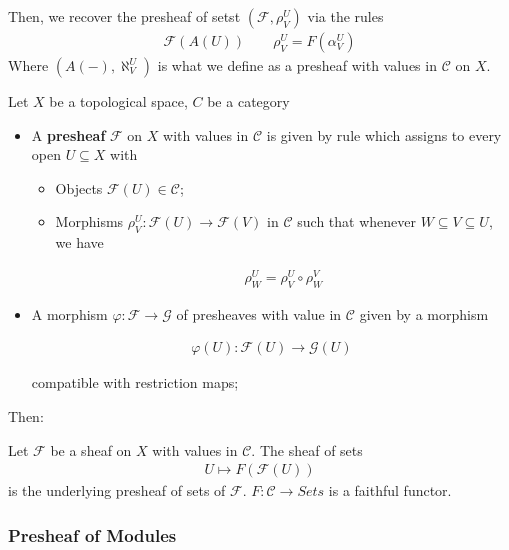 \documentclass[Total.tex]{subfiles}
\begin{document}
				Then, we recover the presheaf of setst $(\mathcal{F},\rho^U_V)$ via the rules
				\begin{gather*}
					\mathcal{F}(A(U))\qquad \rho^U_V=F(\alpha^U_V)
				\end{gather*}
				Where $(A(-),\aleph^U_V)$ is what we define as a presheaf with values in $\mathcal{C}$ on $X$.
				\begin{Def}
					Let $X$ be a topological space, $C$ be a category
					
					\begin{itemize}
						\item A \textbf{presheaf} $\mathcal{F}$ on $X$ with values in $\mathcal{C}$ is given by rule which assigns to every open $U\subseteq X$ with
						
						\begin{itemize}
							\item Objects $\mathcal{F}(U)\in \mathcal{C}$;
							\item Morphisms $\rho^U_V:\mathcal{F}(U)\rightarrow \mathcal{F}(V)$ in $\mathcal{C}$ such that whenever $W\subseteq V\subseteq U$, we have
							
							\begin{gather*}
								\rho^U_W=\rho^U_V\circ \rho_W^V
							\end{gather*}
						\end{itemize}
						\item A morphism $\varphi:\mathcal{F}\rightarrow \mathcal{G}$ of presheaves with value in $\mathcal{C}$ given by a morphism
						
						\begin{gather*}
							\varphi(U):\mathcal{F}(U)\rightarrow \mathcal{G}(U)
						\end{gather*}
						
						compatible with restriction maps;
					\end{itemize}
				\end{Def}
				Then:
				\begin{Def}
					Let $\mathcal{F}$ be a sheaf on $X$ with values in $\mathcal{C}$. The sheaf of sets 
					\begin{gather*}
						U\mapsto F(\mathcal{F}(U))
					\end{gather*}
					is the underlying presheaf of sets of $\mathcal{F}$. $F:\mathcal{C}\rightarrow Sets$ is a faithful functor.
				\end{Def}
				
				
				\subsubsection{Presheaf of Modules}
				
\end{document}
